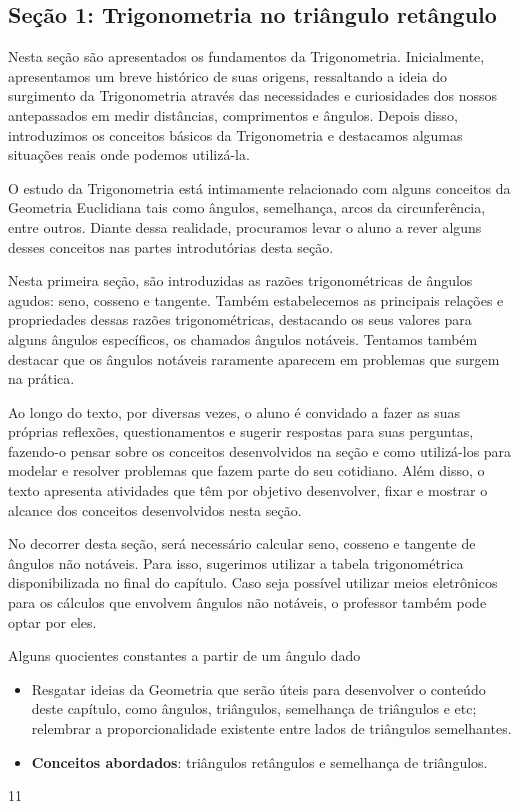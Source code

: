 \def\currentcolor{session1}
\begin{texto}
{
    \section{Seção 1: Trigonometria no triângulo retângulo}

    Nesta seção são apresentados os fundamentos da Trigonometria. Inicialmente, apresentamos um breve histórico de suas origens, ressaltando a ideia do surgimento da Trigonometria através das necessidades e curiosidades dos nossos antepassados em medir distâncias, comprimentos e ângulos. Depois disso, introduzimos os conceitos básicos da Trigonometria e destacamos algumas situações reais onde podemos utilizá-la. 

    O estudo da Trigonometria está intimamente relacionado com alguns conceitos da Geometria Euclidiana tais como ângulos, semelhança, arcos da circunferência, entre outros. Diante dessa realidade, procuramos levar o aluno a rever alguns desses conceitos nas partes introdutórias desta seção.

    Nesta primeira seção, são introduzidas as razões trigonométricas de ângulos agudos: seno, cosseno e tangente. Também estabelecemos as principais relações e propriedades dessas razões trigonométricas, destacando os seus valores para alguns ângulos específicos, os chamados ângulos notáveis. Tentamos também destacar que os ângulos notáveis raramente aparecem em problemas que surgem na prática. 

    Ao longo do texto, por diversas vezes, o aluno é convidado a fazer as suas próprias reflexões, questionamentos e sugerir respostas para suas perguntas, fazendo-o pensar sobre os conceitos desenvolvidos na seção e como utilizá-los para modelar e resolver problemas que fazem parte do seu cotidiano. Além disso, o texto apresenta atividades que têm por objetivo desenvolver, fixar e mostrar o alcance dos conceitos desenvolvidos nesta seção.

    No decorrer desta seção, será necessário calcular seno, cosseno e tangente de ângulos não notáveis. Para isso, sugerimos utilizar a tabela trigonométrica disponibilizada no final do capítulo. Caso seja possível utilizar meios eletrônicos para os cálculos que envolvem ângulos não notáveis, o professor também pode optar por eles.
}
\end{texto}
\clearmargin
\clearmargin
\begin{objectives}{Alguns quocientes constantes a partir de um ângulo dado}
{
\begin{itemize}
\item Resgatar ideias da Geometria que serão úteis para  desenvolver o conteúdo deste capítulo, como ângulos, triângulos, semelhança de triângulos e etc; relembrar a proporcionalidade existente entre lados de triângulos semelhantes.

\item \textbf{Conceitos abordados}: triângulos retângulos e semelhança de triângulos.
\end{itemize}
}{1}{1}
\end{objectives}
